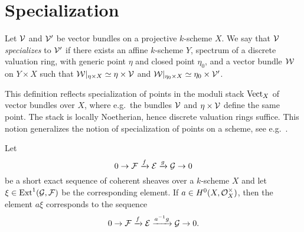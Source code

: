 \section{Specialization}

\begin{definition}
	Let $\mathcal{V}$ and $\mathcal{V'}$ be vector bundles on a projective $k$-scheme $X$. We say that $\mathcal{V}$ \emph{specializes} to $\mathcal{V'}$ if there exists an affine $k$-scheme $Y$, spectrum of a discrete valuation ring, with generic point $\eta$ and closed point $\eta_0$, and a vector bundle $\mathcal{W}$ on
	$Y\times X$
	such that
	$\mathcal{W}|_{\eta \times X} \simeq \eta\times\mathcal{V}$
	and
	$\mathcal{W}|_{\eta_0 \times X} \simeq \eta_0\times\mathcal{V'}$. 
\end{definition}

\begin{remark}
	This definition reflects specialization of points in the moduli stack $\mathrm{Vect}_X$ of vector bundles over $X$, where e.g.\ the bundles $\mathcal{V}$ and $\eta \times \mathcal{V}$ define the same point. The stack is locally Noetherian, hence discrete valuation rings suffice. This notion generalizes the notion of specialization of points on a scheme, see e.g.\ \cite[Prop.\ 7.1.9]{egaii}.
\end{remark}

\begin{remark} \label{rem:scalars-on-ext} Let
	\[ 0 \to \mathcal{F} \xrightarrow{f} \mathcal{E} \xrightarrow{g} \mathcal{G} \to 0 \]
	be a short exact sequence of coherent sheaves over a $k$-scheme $X$ and let $\xi \in \operatorname{Ext}^1(\mathcal{G},\mathcal{F})$ be the corresponding element. If $a \in H^0(X,\mathcal{O}^{\times}_X)$, then the element $a\xi$ corresponds to the sequence
	\[ 0 \to \mathcal{F} \xrightarrow{f} \mathcal{E} \xrightarrow{a^{-1}g} \mathcal{G} \to 0.\]
\end{remark}

